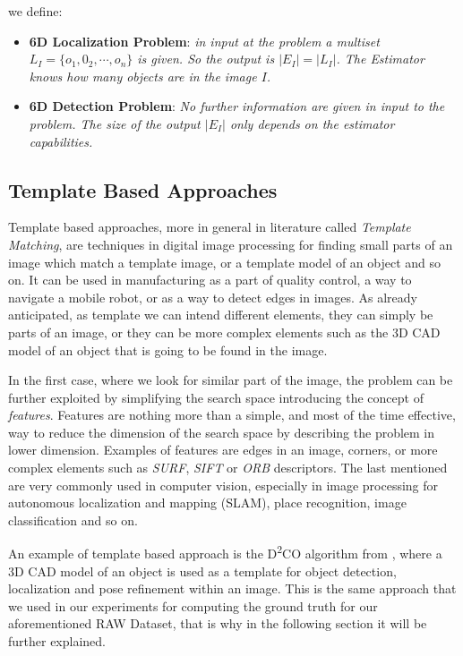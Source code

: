 we define:

\begin{itemize}
	\item \textbf{6D Localization Problem}: \emph{in input at the problem a multiset $L_I = \{o_1, 0_2, \cdots, o_n\}$ is given. So the output is $|E_I| = |L_I|$. The Estimator knows how many objects are in the image $I$.}
	\item \textbf{6D Detection Problem}: \emph{No further information are given in input to the problem. The size of the output $|E_I|$ only depends on the estimator capabilities.}
\end{itemize}

\subsection{Template Based Approaches}\label{subsec:template_matching}
Template based approaches, more in general in literature called \emph{Template Matching}, are techniques in digital image processing for finding small parts of an image which match a template image, or a template model of an object and so on. It can be used in manufacturing as a part of quality control, a way to navigate a mobile robot, or as a way to detect edges in images. As already anticipated, as template we can intend different elements, they can simply be parts of an image, or they can be more complex elements such as the 3D CAD model of an object that is going to be found in the image. 

In the first case, where we look for similar part of the image, the problem can be further exploited by simplifying the search space introducing the concept of \emph{features}. Features are nothing more than a simple, and most of the time effective, way to reduce the dimension of the search space by describing the problem in lower dimension. Examples of features are edges in an image, corners, or more complex elements such as \emph{SURF}, \emph{SIFT} or \emph{ORB} descriptors. The last mentioned are very commonly used in computer vision, especially in image processing for autonomous localization and mapping (SLAM), place recognition, image classification and so on.

An example of template based approach is the D\textsuperscript{2}{CO} algorithm from \cite{imperoli2015d2co}, where a 3D CAD model of an object is used as a template for object detection, localization and pose refinement within an image. This is the same approach that we used in our experiments for computing the ground truth for our aforementioned RAW Dataset, that is why in the following section it will be further explained.

